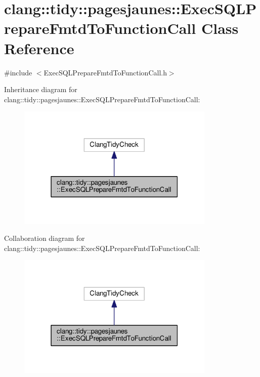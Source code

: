 \hypertarget{classclang_1_1tidy_1_1pagesjaunes_1_1_exec_s_q_l_prepare_fmtd_to_function_call}{}\section{clang\+:\+:tidy\+:\+:pagesjaunes\+:\+:Exec\+S\+Q\+L\+Prepare\+Fmtd\+To\+Function\+Call Class Reference}
\label{classclang_1_1tidy_1_1pagesjaunes_1_1_exec_s_q_l_prepare_fmtd_to_function_call}


{\ttfamily \#include $<$Exec\+S\+Q\+L\+Prepare\+Fmtd\+To\+Function\+Call.\+h$>$}



Inheritance diagram for clang\+:\+:tidy\+:\+:pagesjaunes\+:\+:Exec\+S\+Q\+L\+Prepare\+Fmtd\+To\+Function\+Call\+:
\nopagebreak
\begin{figure}[H]
\begin{center}
\leavevmode
\includegraphics[width=267pt]{classclang_1_1tidy_1_1pagesjaunes_1_1_exec_s_q_l_prepare_fmtd_to_function_call__inherit__graph}
\end{center}
\end{figure}


Collaboration diagram for clang\+:\+:tidy\+:\+:pagesjaunes\+:\+:Exec\+S\+Q\+L\+Prepare\+Fmtd\+To\+Function\+Call\+:
\nopagebreak
\begin{figure}[H]
\begin{center}
\leavevmode
\includegraphics[width=267pt]{classclang_1_1tidy_1_1pagesjaunes_1_1_exec_s_q_l_prepare_fmtd_to_function_call__coll__graph}
\end{center}
\end{figure}
